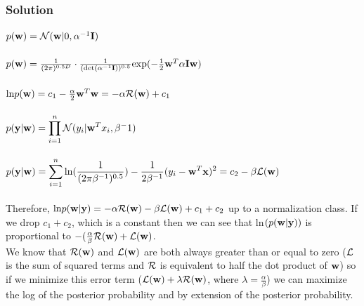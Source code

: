 \documentclass[submit]{harvardml}
\begin{document}
	
	\subsubsection*{Solution}
	
	$p(\mathbf{w})=\mathcal{N}(\mathbf{w}|0,\alpha^{-1}\mathbf{I})$ \\\\
	$p(\mathbf{w})=\frac{1}{(2\pi)^{0.5D}}\cdot\frac{1}{(\textup{det}(\alpha^{-1}\mathbf{I}))^{0.5}}\textup{exp}(-\frac{1}{2}\mathbf{w}^T\alpha\mathbf{I}\mathbf{w})$ \\\\
	$\textup{ln}p(\mathbf{w}) = c_1 - \frac{\alpha}{2}\mathbf{w}^T\mathbf{w} = -\alpha\mathcal{R}(\mathbf{w}) + c_1$ \\\\
	\noindent
	$p(\mathbf{y}| \mathbf{w}) = \displaystyle\prod_{i=1}^{n}\mathcal{N}(y_i|\mathbf{w}^Tx_i, \beta^-1)$\\\\
	$p(\mathbf{y}| \mathbf{w}) = \displaystyle\sum_{i=1}^{n}\textup{ln}(\frac{1}{(2\pi\beta^{-1})^{0.5}})-\frac{1}{2\beta^{-1}}(y_i-\mathbf{w}^T\mathbf{x})^2 = c_2 - \beta \mathcal{L}(\mathbf{w})$
	\\\\
	Therefore, $\textup{ln}p(\mathbf{w}|\mathbf{y}) = -\alpha\mathcal{R}(\mathbf{w})-\beta\mathcal{L}(\mathbf{w})+c_1+c_2$ up to a normalization class.  If we drop $c_1+c_2$, which is a constant then we can see that ln$(p(\mathbf{w}|\mathbf{y}))$ is proportional to $-(\frac{\alpha}{\beta}\mathcal{R}(\mathbf{w})+\mathcal{L}(\mathbf{w})$.  \\
	We know that $\mathcal{R}(\mathbf{w})$ and $\mathcal{L}(\mathbf{w})$ are both always greater than or equal to zero ($\mathcal{L}$ is the sum of squared terms and $\mathcal{R}$ is equivalent to half the dot product of $\mathbf{w}$) so if we minimize this error term ($\mathcal{L}(\mathbf{w})+\lambda\mathcal{R}(\mathbf{w})$, where $\lambda = \frac{\alpha}{\beta}$) we can maximize the log of the posterior probability and by extension of the posterior probability.  
	
	
	
	
	
	
	
	
	
	
	
	
	
	
	
	
	
	
	
	
	
	
	
	
	\newpage
\end{document}
